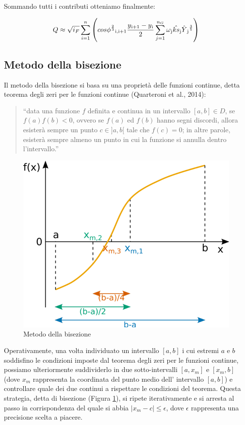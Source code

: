 \documentclass[12pt]{article} %
\begin{document}
\noindent Sommando tutti i contributi otteniamo finalmente:

\begin{equation}
    Q\approx\sqrt{i_F}\sum_{i=1}^n\left(cos\phi^{\frac{2}{3}}\textsubscript{i,i+1}\frac{y\textsubscript{i+1}-y\textsubscript{i}}{2}\sum_{j=1}^{n_G}\omega\textsubscript{j}\hat{ks}\textsubscript{j}\hat{Y}\textsubscript{j}^{\frac{3}{5}}\right)
    \label{eqn:Q_Gauss-Legendre_2}
\end{equation}

\subsection{Metodo della bisezione}

\noindent Il metodo della bisezione si basa su una proprietà delle funzioni continue, detta teorema degli zeri per le funzioni continue (Quarteroni et al., 2014):
\begin{quote}
“data una funzione $f$ definita e continua in un intervallo $[a,b] \in D$, se $f(a) f(b)  < 0$, ovvero se  $f(a)$ ed $f(b)$ hanno segni discordi, allora esisterà sempre un punto $c \in ]a,b[$ tale che $f(c) = 0$; in altre parole, esisterà sempre almeno un punto in cui la funzione si annulla dentro l’intervallo.”
\end{quote}

\begin{figure} [H]
    \centering
    \includegraphics[scale=0.9]{bisezione.png}
    \caption{Metodo della bisezione}
    \label{fig:bisezione}
\end{figure}

\noindent Operativamente, una volta individuato un intervallo $[a,b]$ i cui estremi $a$ e $b$ soddisfino le condizioni imposte dal teorema degli zeri per le funzioni continue, possiamo ulteriormente suddividerlo in due sotto-intervalli $[a,x_m]$ e $[x_m,b]$ (dove $x_m$ rappresenta la coordinata del punto medio dell’ intervallo $[a,b]$) e controllare quale dei due continui a rispettare le condizioni del teorema. Questa strategia, detta di bisezione (Figura \ref{fig:bisezione}), si ripete iterativamente e si arresta al passo in corrispondenza del quale si abbia $|x_m - c| \leq \epsilon$, dove $\epsilon$ rappresenta una precisione scelta a piacere.
\end{document}
